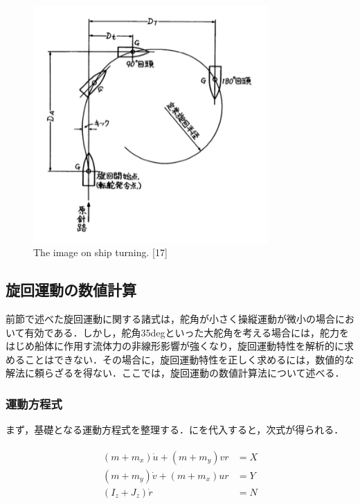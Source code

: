 \begin{figure}[htbp]
    \centering   
    \includegraphics[width=0.8\textwidth]{img/appendix3/2-3.png}
    \caption{The image on ship turning. [17]}
    \label{fig:2-3_png}
\end{figure}

\subsection{旋回運動の数値計算}

前節で述べた旋回運動に関する諸式は，舵角が小さく操縦運動が微小の場合において有効である．しかし，舵角35degといった大舵角を考える場合には，舵力をはじめ船体に作用す流体力の非線形影響が強くなり，旋回運動特性を解析的に求めることはできない．その場合に，旋回運動特性を正しく求めるには，数値的な解法に頼らざるを得ない．ここでは，旋回運動の数値計算法について述べる．

\subsubsection{運動方程式}

まず，基礎となる運動方程式を整理する．にを代入すると，次式が得られる．

\begin{align}
    \begin{split}
        \left(m+m_{x}\right) \dot{u}+\left(m+m_{y}\right) v r&=X \\
        \left(m+m_{y}\right) \dot{v}+\left(m+m_{x}\right) u r&=Y \\
        \left(I_{z}+J_{z}\right) \dot{r}&=N \label{eq:2-51}
    \end{split}
\end{align}

